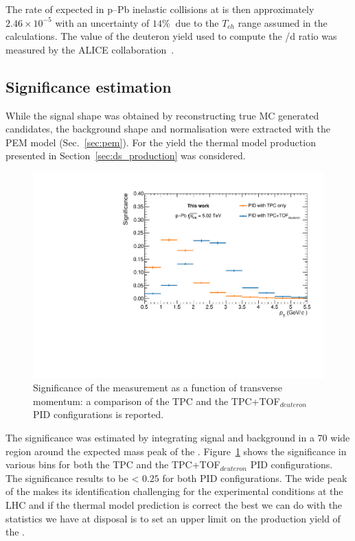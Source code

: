 The rate of expected \dstdecay in p–Pb inelastic collisions at \sctev is then 
approximately $2.46\times10^{-5}$ with an uncertainty of $14\%\ $ due to the $T_{ch}$
range assumed in the calculations. The value of the deuteron yield used to compute the \ds/d
ratio was measured by the ALICE collaboration~\cite{deuteron_in_progress}.

%
\subsection{Significance estimation} \label{sec:sig_sub}

While the signal shape was obtained by reconstructing true MC generated \ds candidates,
the background shape and normalisation were extracted with the PEM model (Sec.~\ref{sec:pem}).
For the \ds yield  the thermal model production presented in Section~\ref{sec:ds_production} was
considered.

\begin{figure} [htb]
\centering
\includegraphics[width=0.7\linewidth]{gfx/sigcomp}
\caption{Significance of the measurement as a function of transverse momentum: a comparison of the TPC and the TPC+TOF$_{deuteron}$ PID configurations is reported.}
\label{fig:significance}
\end{figure}

The significance was estimated by integrating signal and background in a 70 \mevcs wide region
around the expected mass peak of the \ds. 
Figure~\ref{fig:significance} shows the significance in various \pt bins for both the TPC and the
TPC+TOF$_{deuteron}$ PID configurations.
The significance results to be < $0.25$ for both PID configurations. 
The wide peak of the \ds makes its identification challenging for the experimental conditions at the LHC 
and if the thermal model prediction is correct the best we can do with the statistics we have at disposal
is to set an upper limit on the production yield of the \dst.

